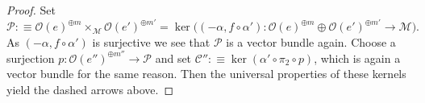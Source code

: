 \begin{proof}
  Set
  $
    \mathcal P :\equiv \mathcal O(e)^{\oplus m} \times_{\mathcal M} \mathcal O(e')^{\oplus m'}
    =
    \ker \big((-\alpha, f\circ\alpha') : \mathcal O(e)^{\oplus m} \oplus \mathcal O(e')^{\oplus m'} \to \mathcal M \big).
  $
  As $(-\alpha, f\circ\alpha')$ is surjective we see that $\mathcal P$ is a vector bundle again.
  Choose a surjection $p : \mathcal O(e'')^{\oplus m''} \to \mathcal P$ and set $\mathcal C'' : \equiv \ker (\alpha' \circ \pi_2 \circ p)$, which is again a vector bundle for the same reason.
  Then the universal properties of these kernels yield the dashed arrows above.
\end{proof}
